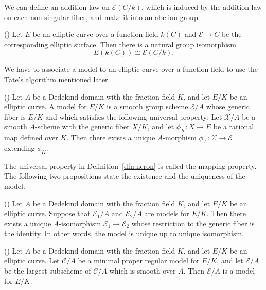 \documentclass[main]{subfiles}
\begin{document}
We can define an addition law on $\mathcal{E}(C/k)$, which is induced by the addition law on each non-singular fiber, and make it into an abelian group.
\begin{prop}{(\cite[Proposition III.3.10. (c)]{ref:advancedaec})}
    Let $E$ be an elliptic curve over a function field $k(C)$ and $\mathcal{E} \to C$ be the corresponding elliptic surface.
    Then there is a natural group isomorphism
    \begin{equation*}
        E(k(C)) \cong \mathcal{E}(C/k).
    \end{equation*}
\end{prop}


We have to associate a \Neron{} model to an elliptic curve over a function field to use the Tate's algorithm mentioned later.

\begin{dfn}{(\cite[IV\S 5 Definition]{ref:advancedaec})}
    \label{dfn:neron}
    Let $A$ be a Dedekind domain with the fraction field $K$, and let $E/K$ be an elliptic curve.
    A \Neron{} model for $E/K$ is a smooth group scheme $\mathcal{E}/A$ whose generic fiber is $E/K$ and which satisfies the following universal property:
    Let $\mathcal{X}/A$ be a smooth $A$-scheme with the generic fiber $X/K$, and let $\phi_K: X \to E$ be a rational map defined over $K$.
    Then there exists a unique $A$-morphism $\phi_A: \mathcal{X} \to \mathcal{E}$ extending $\phi_K$.
\end{dfn}
The universal property in Definition~\ref{dfn:neron} is called the \Neron{} mapping property.
The following two propositions state the existence and the uniqueness of the \Neron{} model.
\begin{prop}{(\cite[Proposition IV.5.2. (a)]{ref:advancedaec})}
    Let $A$ be a Dedekind domain with the fraction field $K$, and let $E/K$ be an elliptic curve.
    Suppose that $\mathcal{E}_1/A$ and $\mathcal{E}_2/A$ are \Neron{} models for $E/K$.
    Then there exists a unique $A$-isomorphism $\mathcal{E}_1 \to \mathcal{E}_2$ whose restriction to the generic fiber is the identity.
    In other words, the \Neron{} model is unique up to unique isomorphism.
\end{prop}

\begin{prop}{(\cite[Theorem IV.6.1.]{ref:advancedaec})}
    Let $A$ be a Dedekind domain with the fraction field $K$, and let $E/K$ be an elliptic curve.
    Let $\mathcal{C}/A$ be a minimal proper regular model for $E/K$, and let $\mathcal{E}/A$ be the largest subscheme of $\mathcal{C}/A$ which is smooth over $A$.
    Then $\mathcal{E}/A$ is a \Neron{} model for $E/K$.
\end{prop}
\end{document}
